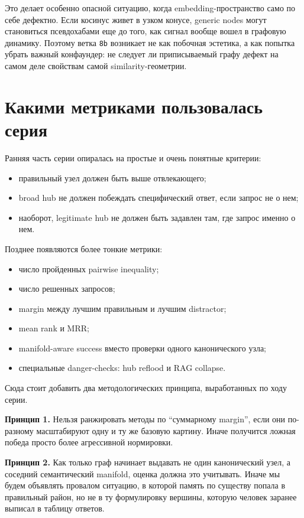Это делает особенно опасной ситуацию, когда embedding-пространство само по себе
дефектно. Если косинус живет в узком конусе, generic nodes могут становиться
псевдохабами еще до того, как сигнал вообще вошел в графовую динамику. Поэтому
ветка \texttt{8b} возникает не как побочная эстетика, а как попытка убрать
важный конфаундер: не следует ли приписываемый графу дефект на самом деле
свойствам самой similarity-геометрии.

\section{Какими метриками пользовалась серия}

Ранняя часть серии опиралась на простые и очень понятные критерии:

\begin{itemize}[leftmargin=2em]
\item правильный узел должен быть выше отвлекающего;
\item broad hub не должен побеждать специфический ответ, если запрос не о нем;
\item наоборот, legitimate hub не должен быть задавлен там, где запрос именно о
нем.
\end{itemize}

Позднее появляются более тонкие метрики:

\begin{itemize}[leftmargin=2em]
\item число пройденных pairwise inequality;
\item число решенных запросов;
\item margin между лучшим правильным и лучшим distractor;
\item mean rank и MRR;
\item manifold-aware success вместо проверки одного канонического узла;
\item специальные danger-checks: hub reflood и RAG collapse.
\end{itemize}

Сюда стоит добавить два методологических принципа, выработанных по ходу серии.

\begin{methodbox}
\textbf{Принцип 1.} Нельзя ранжировать методы по ``суммарному margin'', если они
по-разному масштабируют одну и ту же базовую картину. Иначе получится ложная
победа просто более агрессивной нормировки.

\textbf{Принцип 2.} Как только граф начинает выдавать не один канонический узел,
а соседний семантический manifold, оценка должна это учитывать. Иначе мы будем
объявлять провалом ситуацию, в которой память по существу попала в правильный
район, но не в ту формулировку вершины, которую человек заранее выписал в
таблицу ответов.
\end{methodbox}

